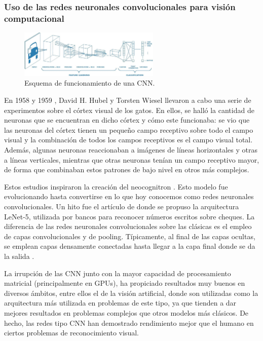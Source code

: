 \subsubsection*{Uso de las redes neuronales convolucionales para visión computacional}

\begin{figure}[H]
	\centering
  \includegraphics[width=0.6\textwidth]{images/cnn}
	\caption{Esquema de funcionamiento de una CNN.}
  \label{fig:cnn}
\end{figure}

En 1958 \cite{art:cat58} y 1959 \cite{art:cat59}, David H. Hubel y Torsten Wiesel llevaron a cabo una serie de experimentos sobre el córtex visual de los gatos. En ellos, se halló la cantidad de neuronas que se encuentran en dicho córtex y cómo este funcionaba: se vio que las neuronas del córtex tienen un pequeño campo receptivo sobre todo el campo visual y la combinación de todos los campos receptivos es el campo visual total. Además, algunas neuronas reaccionaban a imágenes de líneas horizontales y otras a líneas verticales, mientras que otras neuronas tenían un campo receptivo mayor, de forma que combinaban estos patrones de bajo nivel en otros más complejos.

Estos estudios inspiraron la creación del neocognitron \cite{art:neocognitron}. Esto modelo fue evolucionando hasta convertirse en lo que hoy conocemos como redes neuronales convolucionales. Un hito fue el artículo de \citet{lecun1998gradient} donde se propuso la arquitectura LeNet-5, utilizada por bancos para reconocer números escritos sobre cheques. La diferencia de las redes neuronales convolucionales sobre las clásicas es el empleo de capas convolucionales y de pooling. Típicamente, al final de las capas ocultas, se emplean capas densamente conectadas hasta llegar a la capa final donde se da la salida \cite{book:homl}.

La irrupción de las CNN junto con la mayor capacidad de procesamiento matricial (principalmente en GPUs), ha propiciado resultados muy buenos en diversos ámbitos, entre ellos el de la visión artificial, donde son utilizadas como la arquitectura más utilizada en problemas de este tipo, ya que tienden a dar mejores resultados en problemas complejos que otros modelos más clásicos. De hecho, las redes tipo CNN han demostrado rendimiento mejor que el humano en ciertos problemas de reconocimiento visual.

